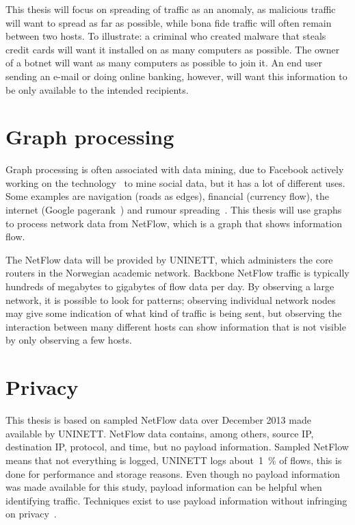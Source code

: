 This thesis will focus on spreading of traffic as an anomaly, as malicious traffic will want to spread as far as possible,
 while bona fide traffic will often remain between two hosts.
To illustrate: a criminal who created malware that steals credit cards will want it installed on as many computers as possible.
The owner of a botnet will want as many computers as possible to join it.
An end user sending an e-mail or doing online banking, however, will want this information to be only available to the intended recipients.


\section{Graph processing}
Graph processing is often associated with data mining, due to Facebook actively working on the technology~\cite{ching2013scaling} to mine social data,
 but it has a lot of different uses.
Some examples are navigation (roads as edges), financial (currency flow), the internet (Google pagerank~\cite{page1999pagerank}) and rumour spreading~\cite{nekovee2007theory}.
This thesis will use graphs to process network data from NetFlow, which is a graph that shows information flow.

The NetFlow data will be provided by UNINETT, which administers the core routers in the Norwegian academic network.
Backbone NetFlow traffic is typically hundreds of megabytes to gigabytes of flow data per day.
By observing a large network, it is possible to look for patterns;
 observing individual network nodes may give some indication of what kind of traffic is being sent,
 but observing the interaction between many different hosts can show information that is not visible by only observing a few hosts.


\section{Privacy}
This thesis is based on sampled NetFlow data over December 2013 made available by UNINETT.
NetFlow data contains, among others, source IP, destination IP, protocol, and time, but no payload information.
Sampled NetFlow means that not everything is logged, UNINETT logs about~1~\% of flows, this is done for performance and storage reasons.
Even though no payload information was made available for this study, payload information can be helpful when identifying traffic.
Techniques exist to use payload information without infringing on privacy~\cite{parekh2006privacy}.


